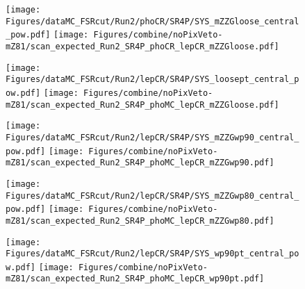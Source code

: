 \begin{figure}
  \centering
  \texttt{[image: Figures/dataMC\_FSRcut/Run2/phoCR/SR4P/SYS\_mZZGloose\_central\_pow.pdf]}
  \hfill
  \texttt{[image: Figures/combine/noPixVeto-mZ81/scan\_expected\_Run2\_SR4P\_phoCR\_lepCR\_mZZGloose.pdf]}
  \caption{}
  \label{fig:scan_FSRcut_Run2_SR4P_phoCR_lepCR_mZZGloose}
\end{figure}

\begin{figure}
  \centering
  \texttt{[image: Figures/dataMC\_FSRcut/Run2/lepCR/SR4P/SYS\_loosept\_central\_pow.pdf]}
  \hfill
  \texttt{[image: Figures/combine/noPixVeto-mZ81/scan\_expected\_Run2\_SR4P\_phoMC\_lepCR\_mZZGloose.pdf]}
  \caption{}
  \label{fig:scan_FSRcut_Run2_SR4P_phoMC_lepCR_mZZGloose}
\end{figure}

\begin{figure}
  \centering
  \texttt{[image: Figures/dataMC\_FSRcut/Run2/lepCR/SR4P/SYS\_mZZGwp90\_central\_pow.pdf]}
  \hfill
  \texttt{[image: Figures/combine/noPixVeto-mZ81/scan\_expected\_Run2\_SR4P\_phoMC\_lepCR\_mZZGwp90.pdf]}
  \caption{}
  \label{fig:scan_FSRcut_Run2_SR4P_phoMC_lepCR_mZZGwp90}
\end{figure}

\begin{figure}
  \texttt{[image: Figures/dataMC\_FSRcut/Run2/lepCR/SR4P/SYS\_mZZGwp80\_central\_pow.pdf]}
  \hfill
  \centering
  \texttt{[image: Figures/combine/noPixVeto-mZ81/scan\_expected\_Run2\_SR4P\_phoMC\_lepCR\_mZZGwp80.pdf]}
  \caption{}
  \label{fig:scan_FSRcut_Run2_SR4P_phoMC_lepCR_mZZGwp80}
\end{figure}

\begin{figure}
  \centering
  \texttt{[image: Figures/dataMC\_FSRcut/Run2/lepCR/SR4P/SYS\_wp90pt\_central\_pow.pdf]}
  \hfill
  \texttt{[image: Figures/combine/noPixVeto-mZ81/scan\_expected\_Run2\_SR4P\_phoMC\_lepCR\_wp90pt.pdf]}
  \caption{}
  \label{fig:scan_FSRcut_Run2_SR4P_phoMC_lepCR_wp90pt}
\end{figure}

